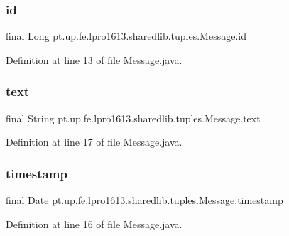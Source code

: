 \subsubsection{\texorpdfstring{id}{id}}
{\footnotesize\ttfamily final Long pt.\+up.\+fe.\+lpro1613.\+sharedlib.\+tuples.\+Message.\+id}



Definition at line 13 of file Message.\+java.

\hypertarget{classpt_1_1up_1_1fe_1_1lpro1613_1_1sharedlib_1_1tuples_1_1_message_ae7464bbbfe859ea3d45ea468a3f41a45}{}\label{classpt_1_1up_1_1fe_1_1lpro1613_1_1sharedlib_1_1tuples_1_1_message_ae7464bbbfe859ea3d45ea468a3f41a45} 
\subsubsection{\texorpdfstring{text}{text}}
{\footnotesize\ttfamily final String pt.\+up.\+fe.\+lpro1613.\+sharedlib.\+tuples.\+Message.\+text}



Definition at line 17 of file Message.\+java.

\hypertarget{classpt_1_1up_1_1fe_1_1lpro1613_1_1sharedlib_1_1tuples_1_1_message_afe3feca5f96527b7182581b84b64ba68}{}\label{classpt_1_1up_1_1fe_1_1lpro1613_1_1sharedlib_1_1tuples_1_1_message_afe3feca5f96527b7182581b84b64ba68} 
\subsubsection{\texorpdfstring{timestamp}{timestamp}}
{\footnotesize\ttfamily final Date pt.\+up.\+fe.\+lpro1613.\+sharedlib.\+tuples.\+Message.\+timestamp}



Definition at line 16 of file Message.\+java.

\hypertarget{classpt_1_1up_1_1fe_1_1lpro1613_1_1sharedlib_1_1tuples_1_1_message_ad18f784cb53089b1cd90e2f6c849b5e8}{}\label{classpt_1_1up_1_1fe_1_1lpro1613_1_1sharedlib_1_1tuples_1_1_message_ad18f784cb53089b1cd90e2f6c849b5e8} 
